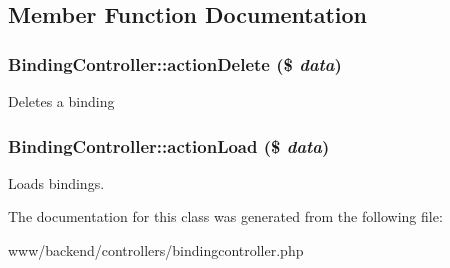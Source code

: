 \subsection{Member Function Documentation}
\hypertarget{classBindingController_a88ab9962fee0cae0a6df7f8f4dd4e56c}{
\subsubsection[{actionDelete}]{\setlength{\rightskip}{0pt plus 5cm}BindingController::actionDelete (\$ {\em data})}}
\label{classBindingController_a88ab9962fee0cae0a6df7f8f4dd4e56c}
Deletes a binding \hypertarget{classBindingController_a3dc0beda70f711e9bc4fba67711ee7ee}{
\subsubsection[{actionLoad}]{\setlength{\rightskip}{0pt plus 5cm}BindingController::actionLoad (\$ {\em data})}}
\label{classBindingController_a3dc0beda70f711e9bc4fba67711ee7ee}
Loads bindings. 

The documentation for this class was generated from the following file:\begin{DoxyCompactItemize}
\item 
www/backend/controllers/bindingcontroller.php\end{DoxyCompactItemize}
